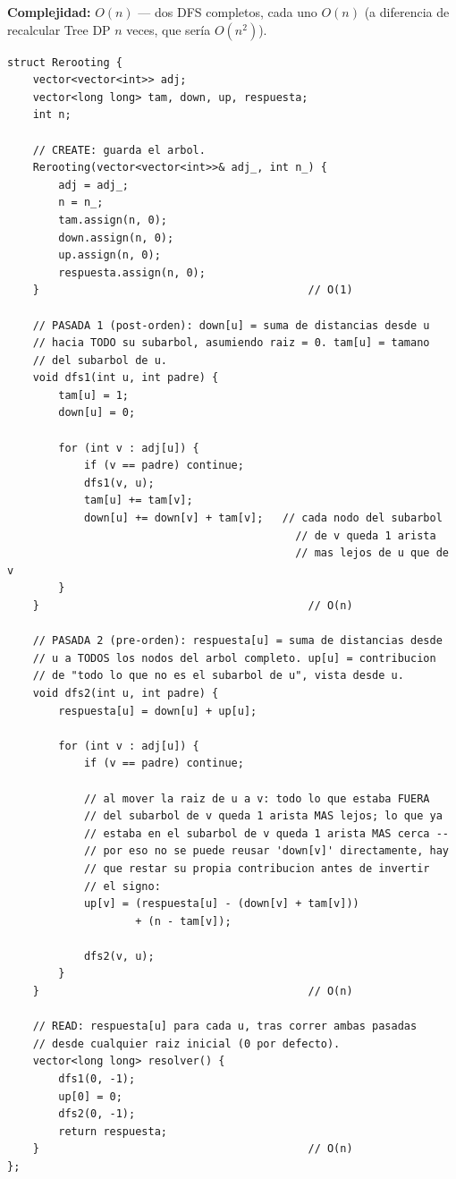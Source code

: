 \documentclass[10pt,a4paper,twocolumn]{article}
\begin{document}
\textbf{Complejidad:} $O(n)$ — dos DFS completos, cada uno $O(n)$
(a diferencia de recalcular Tree DP $n$ veces, que sería $O(n^2)$).

\begin{lstlisting}[style=cpp]
struct Rerooting {
    vector<vector<int>> adj;
    vector<long long> tam, down, up, respuesta;
    int n;

    // CREATE: guarda el arbol.
    Rerooting(vector<vector<int>>& adj_, int n_) {
        adj = adj_;
        n = n_;
        tam.assign(n, 0);
        down.assign(n, 0);
        up.assign(n, 0);
        respuesta.assign(n, 0);
    }                                          // O(1)

    // PASADA 1 (post-orden): down[u] = suma de distancias desde u
    // hacia TODO su subarbol, asumiendo raiz = 0. tam[u] = tamano
    // del subarbol de u.
    void dfs1(int u, int padre) {
        tam[u] = 1;
        down[u] = 0;

        for (int v : adj[u]) {
            if (v == padre) continue;
            dfs1(v, u);
            tam[u] += tam[v];
            down[u] += down[v] + tam[v];   // cada nodo del subarbol
                                             // de v queda 1 arista
                                             // mas lejos de u que de v
        }
    }                                          // O(n)

    // PASADA 2 (pre-orden): respuesta[u] = suma de distancias desde
    // u a TODOS los nodos del arbol completo. up[u] = contribucion
    // de "todo lo que no es el subarbol de u", vista desde u.
    void dfs2(int u, int padre) {
        respuesta[u] = down[u] + up[u];

        for (int v : adj[u]) {
            if (v == padre) continue;

            // al mover la raiz de u a v: todo lo que estaba FUERA
            // del subarbol de v queda 1 arista MAS lejos; lo que ya
            // estaba en el subarbol de v queda 1 arista MAS cerca --
            // por eso no se puede reusar 'down[v]' directamente, hay
            // que restar su propia contribucion antes de invertir
            // el signo:
            up[v] = (respuesta[u] - (down[v] + tam[v]))
                    + (n - tam[v]);

            dfs2(v, u);
        }
    }                                          // O(n)

    // READ: respuesta[u] para cada u, tras correr ambas pasadas
    // desde cualquier raiz inicial (0 por defecto).
    vector<long long> resolver() {
        dfs1(0, -1);
        up[0] = 0;
        dfs2(0, -1);
        return respuesta;
    }                                          // O(n)
};


\end{lstlisting}
\end{document}
